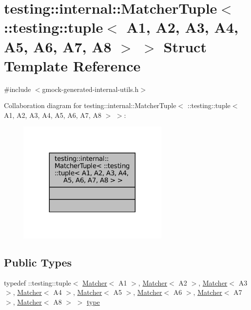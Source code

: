 \hypertarget{structtesting_1_1internal_1_1MatcherTuple_3_01_1_1testing_1_1tuple_3_01A1_00_01A2_00_01A3_00_01Aed2bba98e2ef5f11a8df3506707ec6d8}{}\section{testing\+:\+:internal\+:\+:Matcher\+Tuple$<$ \+:\+:testing\+:\+:tuple$<$ A1, A2, A3, A4, A5, A6, A7, A8 $>$ $>$ Struct Template Reference}
\label{structtesting_1_1internal_1_1MatcherTuple_3_01_1_1testing_1_1tuple_3_01A1_00_01A2_00_01A3_00_01Aed2bba98e2ef5f11a8df3506707ec6d8}


{\ttfamily \#include $<$gmock-\/generated-\/internal-\/utils.\+h$>$}



Collaboration diagram for testing\+:\+:internal\+:\+:Matcher\+Tuple$<$ \+:\+:testing\+:\+:tuple$<$ A1, A2, A3, A4, A5, A6, A7, A8 $>$ $>$\+:
\nopagebreak
\begin{figure}[H]
\begin{center}
\leavevmode
\includegraphics[width=212pt]{structtesting_1_1internal_1_1MatcherTuple_3_01_1_1testing_1_1tuple_3_01A1_00_01A2_00_01A3_00_01A45097ef5f2e75a56dc8ddfd6b8846b5a}
\end{center}
\end{figure}
\subsection*{Public Types}
\begin{DoxyCompactItemize}
\item 
typedef \+::testing\+::tuple$<$ \hyperlink{classtesting_1_1Matcher}{Matcher}$<$ A1 $>$, \hyperlink{classtesting_1_1Matcher}{Matcher}$<$ A2 $>$, \hyperlink{classtesting_1_1Matcher}{Matcher}$<$ A3 $>$, \hyperlink{classtesting_1_1Matcher}{Matcher}$<$ A4 $>$, \hyperlink{classtesting_1_1Matcher}{Matcher}$<$ A5 $>$, \hyperlink{classtesting_1_1Matcher}{Matcher}$<$ A6 $>$, \hyperlink{classtesting_1_1Matcher}{Matcher}$<$ A7 $>$, \hyperlink{classtesting_1_1Matcher}{Matcher}$<$ A8 $>$ $>$ \hyperlink{structtesting_1_1internal_1_1MatcherTuple_3_01_1_1testing_1_1tuple_3_01A1_00_01A2_00_01A3_00_01Aed2bba98e2ef5f11a8df3506707ec6d8_a17186b5ae808ec16b84eb4022ab7a089}{type}
\end{DoxyCompactItemize}


